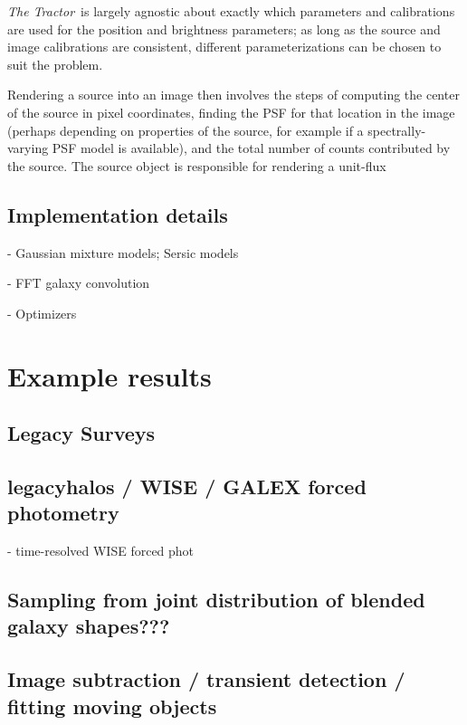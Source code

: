 \documentclass[modern, linenumbers]{aastex631}
\newcommand{\thetractor}{\emph{The Tractor}}
\begin{document}
\thetractor\ is largely agnostic about exactly which parameters and
calibrations are used for the position and brightness parameters; as
long as the source and image calibrations are consistent, different
parameterizations can be chosen to suit the problem.


Rendering a source into an image then involves the steps of computing
the center of the source in pixel coordinates, finding the PSF for
that location in the image (perhaps depending on properties of the
source, for example if a spectrally-varying PSF model is available),
and the total number of counts contributed by the source.  The source
object is responsible for rendering a unit-flux




\subsection{Implementation details}

- Gaussian mixture models; Sersic models

- FFT galaxy convolution

- Optimizers

\section{Example results}



\subsection{Legacy Surveys}

\subsection{legacyhalos / WISE / GALEX forced photometry}

- time-resolved WISE forced phot

\subsection{Sampling from joint distribution of blended galaxy shapes???}

\subsection{Image subtraction / transient detection / fitting moving objects}
\end{document}
